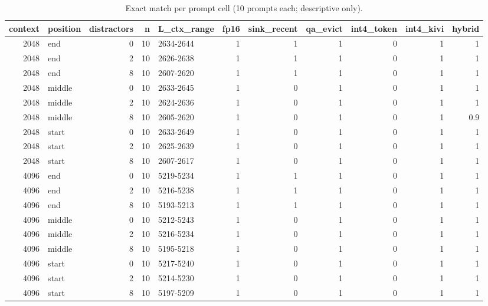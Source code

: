 \begin{table}
\caption{Exact match per prompt cell (10 prompts each; descriptive only).}
\label{tab:task2c_kv_cells}
\begin{tabular}{rlrrlrrrrrr}
\toprule
context & position & distractors & n & L\_ctx\_range & fp16 & sink\_recent & qa\_evict & int4\_token & int4\_kivi & hybrid \\
\midrule
2048 & end & 0 & 10 & 2634-2644 & 1 & 1 & 1 & 0 & 1 & 1 \\
2048 & end & 2 & 10 & 2626-2638 & 1 & 1 & 1 & 0 & 1 & 1 \\
2048 & end & 8 & 10 & 2607-2620 & 1 & 1 & 1 & 0 & 1 & 1 \\
2048 & middle & 0 & 10 & 2633-2645 & 1 & 0 & 1 & 0 & 1 & 1 \\
2048 & middle & 2 & 10 & 2624-2636 & 1 & 0 & 1 & 0 & 1 & 1 \\
2048 & middle & 8 & 10 & 2605-2620 & 1 & 0 & 1 & 0 & 1 & 0.9 \\
2048 & start & 0 & 10 & 2633-2649 & 1 & 0 & 1 & 0 & 1 & 1 \\
2048 & start & 2 & 10 & 2625-2639 & 1 & 0 & 1 & 0 & 1 & 1 \\
2048 & start & 8 & 10 & 2607-2617 & 1 & 0 & 1 & 0 & 1 & 1 \\
4096 & end & 0 & 10 & 5219-5234 & 1 & 1 & 1 & 0 & 1 & 1 \\
4096 & end & 2 & 10 & 5216-5238 & 1 & 1 & 1 & 0 & 1 & 1 \\
4096 & end & 8 & 10 & 5193-5213 & 1 & 1 & 1 & 0 & 1 & 1 \\
4096 & middle & 0 & 10 & 5212-5243 & 1 & 0 & 1 & 0 & 1 & 1 \\
4096 & middle & 2 & 10 & 5216-5234 & 1 & 0 & 1 & 0 & 1 & 1 \\
4096 & middle & 8 & 10 & 5195-5218 & 1 & 0 & 1 & 0 & 1 & 1 \\
4096 & start & 0 & 10 & 5217-5240 & 1 & 0 & 1 & 0 & 1 & 1 \\
4096 & start & 2 & 10 & 5214-5230 & 1 & 0 & 1 & 0 & 1 & 1 \\
4096 & start & 8 & 10 & 5197-5209 & 1 & 0 & 1 & 0 & 1 & 1 \\
\bottomrule
\end{tabular}
\end{table}
